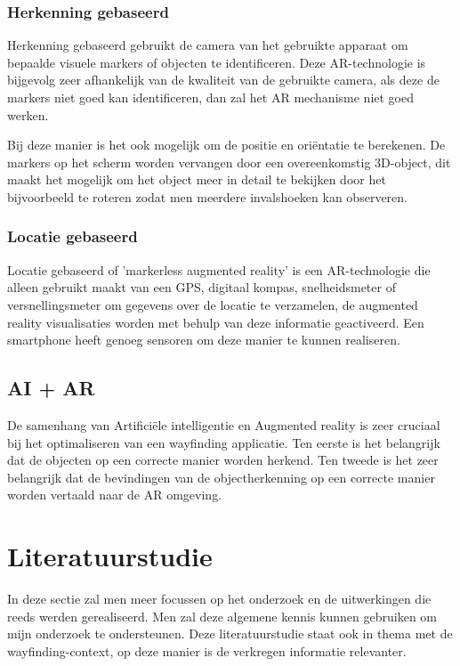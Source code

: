 \subsubsection{Herkenning gebaseerd}
Herkenning gebaseerd gebruikt de camera van het gebruikte apparaat om bepaalde visuele markers of objecten te identificeren. Deze AR-technologie is bijgevolg zeer afhankelijk van de kwaliteit van de gebruikte camera, als deze de markers niet goed kan identificeren, dan zal het AR mechanisme niet goed werken.

Bij deze manier is het ook mogelijk om de positie en oriëntatie te berekenen. De markers op het scherm worden vervangen door een overeenkomstig 3D-object, dit maakt het mogelijk om het object meer in detail te bekijken door het bijvoorbeeld te roteren zodat men meerdere invalshoeken kan observeren.

\subsubsection{Locatie gebaseerd}
Locatie gebaseerd of 'markerless augmented reality' is een AR-technologie die alleen gebruikt maakt van een GPS, digitaal kompas, snelheidsmeter of versnellingsmeter om gegevens over de locatie te verzamelen, de augmented reality visualisaties worden met behulp van deze informatie geactiveerd. Een smartphone heeft genoeg sensoren om deze manier te kunnen realiseren. 

\subsection{AI + AR}
De samenhang van Artificiële intelligentie en Augmented reality is zeer cruciaal bij het optimaliseren van een wayfinding applicatie. Ten eerste is het belangrijk dat de objecten op een correcte manier worden herkend. Ten tweede is het zeer belangrijk dat de bevindingen van de objectherkenning op een correcte manier worden vertaald naar de AR omgeving. 

\section{Literatuurstudie}

In deze sectie zal men meer focussen op het onderzoek en de uitwerkingen die reeds werden gerealiseerd. Men zal deze algemene kennis kunnen gebruiken om mijn onderzoek te ondersteunen. Deze literatuurstudie staat ook in thema met de wayfinding-context, op deze manier is de verkregen informatie relevanter.

